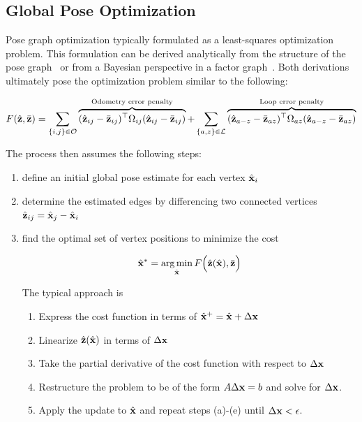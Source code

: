 \subsection{Global Pose Optimization}


Pose graph optimization typically formulated as a least-squares optimization problem.  This formulation can be derived analytically from the structure of the pose graph~\cite{Kummerle2011} or from a Bayesian perspective in a factor graph~\cite{Kaess2008}.  Both derivations ultimately pose the optimization problem similar to the following:

\begin{align}
  F(\hat{\mathbf{z}},\bar{\mathbf{z}}) = \sum_{\{i,j\} \in \mathcal{O}} \overbrace{(\hat{\mathbf{z}}_{ij}-\bar{\mathbf{z}}_{ij})^\top\Omega_{ij}(\hat{\mathbf{z}}_{ij}-\bar{\mathbf{z}}_{ij})}^\text{Odometry error penalty} + \sum_{\{a,z\} \in \mathcal{L}} \overbrace{ (\hat{\mathbf{z}}_{a-z}-\bar{\mathbf{z}}_{az})^\top \Omega_{az} (\hat{\mathbf{z}}_{a-z}-\bar{\mathbf{z}}_{az}) }^\text{Loop error penalty}
  \label{eqn:cost_function}
\end{align}

The process then assumes the following steps:

\begin{enumerate}
  \item define an initial global pose estimate for each vertex $\hat{\mathbf{x}}_i$
  \item determine the estimated edges by differencing two connected vertices $\hat{\mathbf{z}}_{ij} = \hat{\mathbf{x}}_j - \hat{\mathbf{x}}_i$
  \item find the optimal set of vertex positions to minimize the cost

  \begin{align}
      \hat{\mathbf{x}}^* = \operatorname*{arg\,min}_{\hat{\mathbf{x}}} F\Big(\hat{\mathbf{z}}(\hat{\mathbf{x}}),\bar{\mathbf{z}} \Big)
	     \label{eqn:global_opt}
	\end{align}

  The typical approach is
		\begin{enumerate}
		\item Express the cost function in terms of $\hat{\mathbf{x}}^+ = \hat{\mathbf{x}} + \Delta\mathbf{x}$
		\item Linearize $\hat{\mathbf{z}}(\hat{\mathbf{x}})$ in terms of $\Delta\mathbf{x}$
		\item Take the partial derivative of the cost function with respect to $\Delta\mathbf{x}$
		\item Restructure the problem to be of the form $A \Delta \mathbf{x} = b$ and solve for $\Delta\mathbf{x}$.
		\item Apply the update to $\hat{\mathbf{x}}$ and repeat steps (a)-(e) until $\Delta\mathbf{x} < \epsilon$.
	\end{enumerate}

\end{enumerate}

